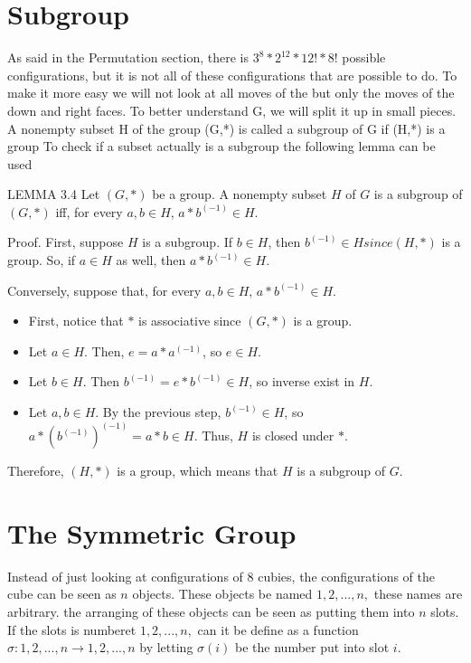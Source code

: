 \section{Subgroup}
As said in the Permutation section, there is $3^8*2^{12}*12!*8!$ possible configurations, but it is not all of these configurations that are possible to do.  To make it more easy we will not look at all moves of the \rubik{} but only the moves of the down and right faces. To better understand G, we will split it up in small pieces.
A nonempty subset H of the group (G,*) is called a subgroup of G if (H,*) is a group
To check if a subset actually is a subgroup the following lemma can be used

LEMMA 3.4
Let $(G,*)$ be a group. A nonempty subset $H$ of $G$ is a subgroup of $(G,*)$ iff, for every $a, b \in H$, $a * b^(-1) \in H$.

Proof. First, suppose $H$ is a subgroup. If $b \in H$, then $b^(-1) \in H since (H,*)$ is a group. So, if $a \in H$ as well, then $a * b^(-1) \in H$.

Conversely, suppose that, for every $a, b \in H$, $a * b^(-1) \in H$.

\begin {itemize}
\item First, notice that $*$ is associative since $(G,*)$ is a group.
\item Let $a \in H$. Then, $e = a * a^(-1)$, so $e \in H$.
\item Let $b \in H$. Then $b^(-1) = e * b^(-1) \in H$, so inverse exist in $H$.
\item Let $a, b \in H$. By the previous step, $b^(-1) \in H$, so $a* (b^(-1))^(-1) = a* b \in H$. Thus, $H$ is closed under $*$.
\end {itemize}

Therefore, $(H,*)$ is a group, which means that $H$ is a subgroup of $G$.

\section{The Symmetric Group}

Instead of just looking at configurations of 8 cubies, the configurations of the cube can be seen as $n$ objects. 
These objects be named $1, 2, . . . , n,$ these names are arbitrary. the arranging of these objects can be seen as
putting them into $n$ slots. If the slots is numberet $1, 2, . . . , n,$ can it be define as a function $\sigma : {1, 2, . . . , n} \rightarrow
{1, 2, . . . , n}$ by letting $\sigma(i)$ be the number put into slot $i$.

